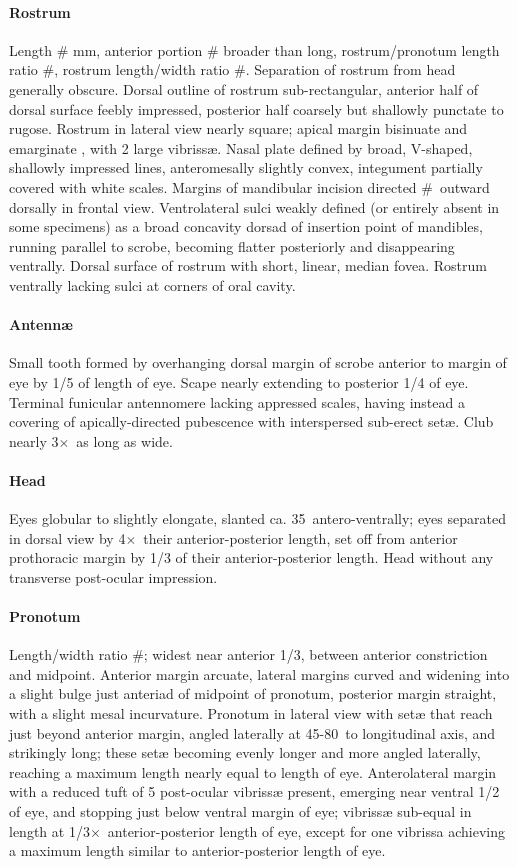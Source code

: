 \documentclass[fleqn,10pt,lineno]{wlpeerj} %
\newcommand{\td}{\textdegree~}
\newcommand{\x}{$\times$~}
\begin{document}
			\paragraph{Rostrum}
				Length \# mm, anterior portion \# broader than long, rostrum/pronotum length ratio \#, rostrum length/width ratio \#.
				Separation of rostrum from head generally obscure. 
				Dorsal outline of rostrum sub-rectangular, anterior half of dorsal surface feebly impressed, posterior half coarsely but shallowly punctate to rugose. 
				Rostrum in lateral view nearly square; apical margin bisinuate and emarginate , with 2 large vibriss{\ae}. 
				Nasal plate defined by broad, V-shaped, shallowly impressed lines, anteromesally slightly convex, integument partially covered with white scales. 
				Margins of mandibular incision directed \#\td outward dorsally in frontal view. 
				Ventrolateral sulci weakly defined (or entirely absent in some specimens) as a broad concavity dorsad of insertion point of mandibles, running parallel to scrobe, becoming flatter posteriorly and disappearing ventrally.
				Dorsal surface of rostrum with  short, linear, median fovea.
				Rostrum ventrally lacking sulci at corners of oral cavity.
			\paragraph{Antenn{\ae}}
				Small tooth formed by overhanging dorsal margin of scrobe anterior to margin of eye by 1/5 of length of eye.
				Scape nearly extending to posterior 1/4 of eye.
				Terminal funicular antennomere lacking appressed scales, having instead a covering of apically-directed pubescence with interspersed sub-erect set{\ae}.
				Club nearly 3\x as long as wide.
			\paragraph{Head}
				Eyes globular to slightly elongate, slanted ca. 35\td antero-ventrally; eyes separated in dorsal view by 4\x their anterior-posterior length, set off from anterior prothoracic margin by 1/3 of their anterior-posterior length. 
				Head without any transverse post-ocular impression.
			\paragraph{Pronotum}
				Length/width ratio \#; widest near anterior 1/3, between anterior constriction and midpoint. 
				Anterior margin arcuate, lateral margins curved and widening into a slight bulge just anteriad of midpoint of pronotum, posterior margin straight, with a slight mesal incurvature. 
				Pronotum in lateral view with set{\ae} that reach just beyond anterior margin, angled laterally at 45-80\td to longitudinal axis, and strikingly long; these set{\ae} becoming evenly longer and more angled laterally, reaching a maximum length nearly equal to length of eye. 
				Anterolateral margin with a reduced tuft of 5 post-ocular vibriss{\ae} present, emerging near ventral 1/2 of eye, and stopping just below ventral margin of eye; vibriss{\ae} sub-equal in length at 1/3\x anterior-posterior length of eye, except for one vibrissa achieving a maximum length similar to anterior-posterior length of eye.
\end{document}
